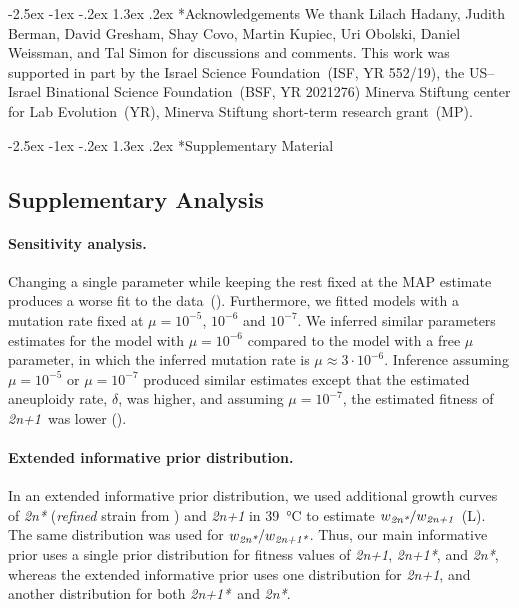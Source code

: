 \documentclass[12pt]{extarticle}
\makeatletter
\renewcommand\section{\@startsection {section}{1}{\z@}%
     {-2.5ex \@plus -1ex \@minus -.2ex}%
     {1.3ex \@plus.2ex}%
    {\Large\bfseries}}
\newcommand{\anwt}{\emph{2n+1}}
\newcommand{\eumt}{\emph{2n*}}
\newcommand{\anmt}{\emph{2n+1*}}
\newcommand{\beginsupplement}{%
      	\setcounter{table}{0}
        \renewcommand{\thetable}{S\arabic{table}}%
        \setcounter{figure}{0}
        \renewcommand{\thefigure}{S\arabic{figure}}%
}
\makeatother
\begin{document}

{\small
\section*{Acknowledgements}
We thank Lilach Hadany, Judith Berman, David Gresham, Shay Covo, Martin Kupiec, Uri Obolski, Daniel Weissman, and Tal Simon for discussions and comments.
This work was supported in part by 
the Israel Science Foundation~(ISF, YR 552/19),
the US--Israel Binational Science Foundation~(BSF, YR 2021276)
Minerva Stiftung center for Lab Evolution~(YR),
Minerva Stiftung short-term research grant~(MP).
}




\newpage

\section*{Supplementary Material}
\beginsupplement %

\subsection*{Supplementary Analysis}
\label{sec:supp_analysis}

\paragraph{Sensitivity analysis.} 
Changing a single parameter while keeping the rest fixed at the MAP estimate produces a worse fit to the data~().
Furthermore, we fitted models with a mutation rate fixed at $\mu=10^{-5}$, $10^{-6}$ and $10^{-7}$.
We inferred similar parameters estimates for the model with $\mu=10^{-6}$ compared to the model with a free $\mu$ parameter, in which the inferred mutation rate is $\mu \approx 3\cdot10^{-6}$.
Inference assuming $\mu=10^{-5}$ or $\mu=10^{-7}$ produced similar estimates except that the estimated aneuploidy rate, $\delta$, was higher, and assuming $\mu=10^{-7}$, the estimated fitness of \anwt\ was lower ().

\paragraph{Extended informative prior distribution.}
In an extended informative prior distribution, we used additional growth curves of \eumt\; (\emph{refined} strain from \citet{Yona2012}) and \anwt\; in \SI{39}{\celsius} to estimate $w_{\eumt}/w_{\anwt}$~(L). The same distribution was used for $w_{\eumt}/w_{\anmt}$. 
Thus, our main informative prior uses a single prior distribution for fitness values of \anwt, \anmt, and \eumt, whereas the extended informative prior uses one distribution for \anwt, and another distribution for both \anmt\ and \eumt. 
\end{document}
